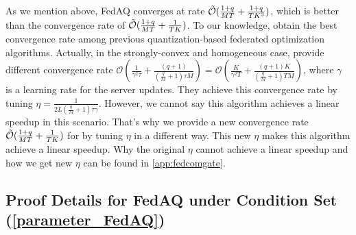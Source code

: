 \documentclass[11pt]{article}
\begin{document}
\begin{remark} \label{remark5.5} As we mention above, FedAQ converges at rate $\Tilde{\mathcal{O}}(\frac{1+q}{MT} + \frac{1+q}{TK^3})$, which is better than the convergence rate of \cite{Yeojoon-haddadpour2021federated} $\Tilde{\mathcal{O}}(\frac{1+q}{MT}+\frac{1}{TK})$. To our knowledge, \cite{Yeojoon-haddadpour2021federated} obtain the best convergence rate among previous quantization-based federated optimization algorithms. Actually, in the strongly-convex and homogeneous case, \cite{Yeojoon-haddadpour2021federated} provide different convergence rate $\mathcal{O}(\frac{1}{\gamma^2\tau} + \frac{(q+1)}{(\frac{q}{M}+1)\tau M}) = \mathcal{O}(\frac{K}{\gamma^2 T} + \frac{(q+1)K}{(\frac{q}{M}+1)T M})$, where $\gamma$ is a learning rate for the server updates. They achieve this convergence rate by tuning $\eta = \frac{1}{2L(\frac{q}{M} + 1)\tau \gamma}$. However, we cannot say this algorithm achieves a linear speedup in this scenario. That's why we provide a new convergence rate $\Tilde{\mathcal{O}}(\frac{1+q}{MT}+\frac{1}{TK})$ for \cite{Yeojoon-haddadpour2021federated} by tuning $\eta$ in a different way. This new $\eta$ makes this algorithm achieve a linear speedup. Why the original $\eta$ cannot achieve a linear speedup and how we get new $\eta$ can be found in \cref{app:fedcomgate}.
\end{remark}

\subsection{Proof Details for FedAQ under Condition Set (\ref{parameter_FedAQ})}
\label{app:proofs}
\end{document}
